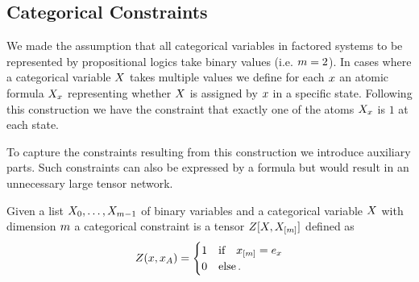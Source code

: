 \subsection{Categorical Constraints}\label{sec:categoricalTN}


We made the assumption that all categorical variables in factored systems to be represented by propositional logics take binary values (i.e. $m=2$).
In cases where a categorical variable $X$ takes multiple values we define for each $x$ an atomic formula $X_{x}$ representing whether $X$ is assigned by $x$ in a specific state.
Following this construction we have the constraint that exactly one of the atoms $X_{x}$ is $1$ at each state.

To capture the constraints resulting from this construction we introduce auxiliary parts. %
Such constraints can also be expressed by a formula but would result in an unnecessary large tensor network.


\begin{definition}
	Given a list $X_{0},\ldots,X_{m-1}$ of binary variables and a categorical variable $X$ with dimension $m$ a categorical constraint is a tensor $Z[X,X_{[m]}]$ defined as
	\begin{align*}
		 Z(x,x_{A}) 
		 = \begin{cases} 
		 	1 & \text{if} \quad x_{[m]} = e_{x} \\
			0 & \text{else} \, . 
		 \end{cases}
	\end{align*}
\end{definition}

